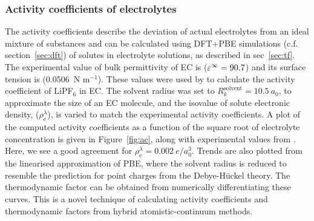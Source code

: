 \documentclass[../main.tex]{subfiles}
\begin{document}
\subsubsection{Activity coefficients of electrolytes}
The activity coefficients describe the deviation of actual electrolytes from an ideal mixture of substances\cite{Atkins2014} and can be calculated using DFT+PBE simulations (c.f. section~\ref{sec:dft}) of solutes in electrolyte solutions, as described in sec~\ref{sec:tf}. The experimental value of bulk permittivity of EC is ($\varepsilon^\infty=90.7$)\cite{Hall2015} and its surface tension is (0.0506~N m$^{-1}$).\cite{Naejus2002} These values were used by \citeauthor{Dziedzic2020} to calculate the activity coefficient of LiPF$_6$ in EC.\cite{Dziedzic2020} The solvent radius was set to $R^\textrm{solvent}_k= 10.5~a_0$, to approximate the size of an EC molecule, and the isovalue of solute electronic density, ($\rho_{\textrm{e}}^\lambda$), is varied to match the experimental activity coefficients. A plot of the computed activity coefficients as a function of the square root of electrolyte concentration is given in Figure~\ref{fig:ac}, along with experimental values from \citeauthor{Stewart2008}.\cite{Stewart2008} Here, we see a good agreement for $\rho_{\textrm{e}}^\lambda=0.002~e/a_0^3$. Trends are also plotted from the linearised approximation of PBE, where the solvent radius is reduced to resemble the prediction for point charges from the Debye-H\"uckel theory.\cite{debye1923theory} The thermodynamic factor can be obtained from numerically differentiating these curves. This is a novel technique of calculating activity coefficients and thermodynamic factors from hybrid atomistic-continuum methods.
\end{document}
